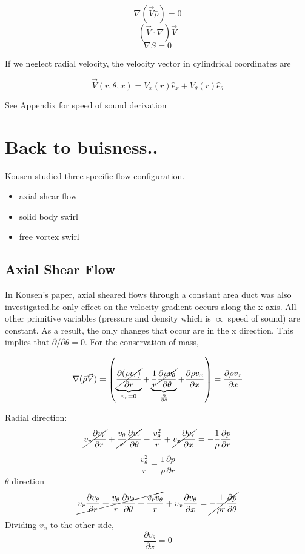 \documentclass[12pt]{article}
\begin{document}
\[\nabla (\vec{V} \bar{\rho}) = 0\]
\[(\vec{V}\cdot \nabla) \vec{V}\]
\[\nabla S = 0\]

If we neglect radial velocity, the velocity vector in cylindrical coordinates are

\[\vec{V}(r,\theta,x) = V_x(r) \hat{e}_x + V_{\theta} (r) \hat{e}_{\theta} \]

See Appendix for speed of sound derivation
\section{Back to buisness..}
Kousen studied three specific flow configuration.

\begin{itemize}
	\item axial shear flow
	\item solid body swirl
	\item free vortex swirl
\end{itemize}
\subsection{Axial Shear Flow}
In Kousen's paper, axial sheared flows through a constant area duct was also investigated.he only effect on the velocity gradient occurs along the x axis. All other primitive variables (pressure and density which is $\propto$ speed of sound) are constant. As a result, the only changes that occur are in the x direction. This implies that $\partial / \partial \theta = 0$. For the conservation of mass,

\[ \nabla (\bar{\rho}\vec{V}) =  \left( 
\underbrace{
	\cancel{
		\frac{\partial (\bar{\rho}v_r)	}{\partial r}
	}
}_{v_r = 0} +
\underbrace{\cancel{\frac{1}{r}	\frac{\partial \bar{\rho}v_{\theta}}{\partial \theta}}}_{\frac{\partial }{\partial \theta}} +
\frac{\partial \bar{\rho}v_x}{\partial x}
\right) = \frac{\partial \bar{\rho}v_x}{\partial x}\] 

Radial direction:
\[
\cancel{v_r \frac{\partial v_r}{\partial r}} +
\cancel{\frac{v_{\theta}  }{r}
	\frac{\partial v_r}{\partial \theta}}- \frac{v_{\theta}^2}{r}+ 
\cancel{v_x \frac{\partial v_r}{\partial x} }
= -\frac{1}{\rho} \frac{\partial p}{\partial r}
\]
\[
\frac{v_{\theta}^2}{r}
= \frac{1}{\rho} \frac{\partial p}{\partial r}
\]
$\theta$ direction
\[\cancel{v_r \frac{\partial v_{\theta}}{\partial r} +
	\frac{v_{\theta}}{r}
	\frac{\partial v_{\theta}}{\partial \theta} +
	\frac{v_r v_{\theta}}{r}}+ 
v_x \frac{\partial v_{\theta}}{\partial x} 
= \cancel{-\frac{1}{\rho r} \frac{\partial p}{\partial \theta}}\]
Dividing $v_x$ to the other side,
\[ \frac{\partial v_{\theta}}{\partial x}  = 0\]
\end{document}
